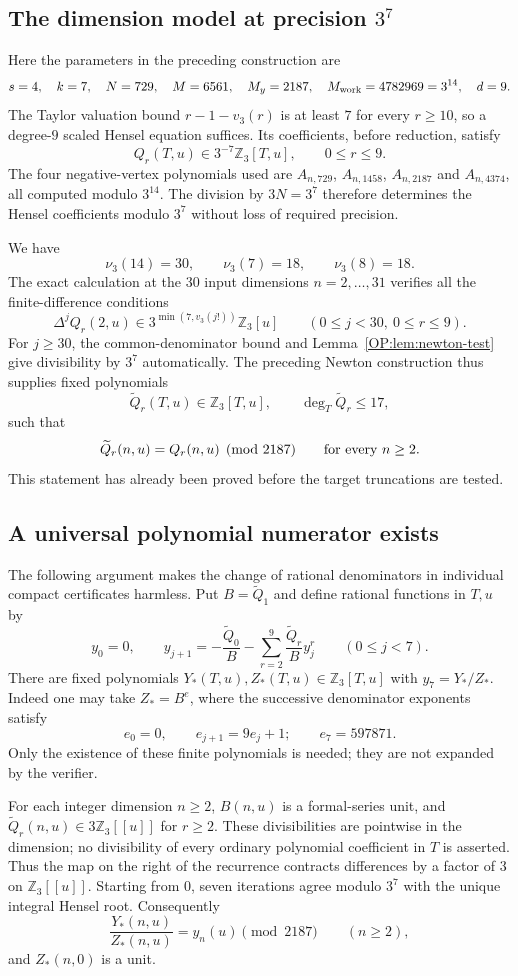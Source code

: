 \documentclass[11pt,a4paper]{article}
\theoremstyle{definition}\newtheorem{definition}[theorem]{Definition}
\theoremstyle{remark}\newtheorem{remark}[theorem]{Remark}
\numberwithin{equation}{section}
\begin{document}
\subsection{The dimension model at precision $3^7$}
Here the parameters in the preceding construction are
\[
 s=4,\quad k=7,\quad N=729,\quad M=6561,\quad M_y=2187,
 \quad M_{\rm work}=4782969=3^{14},\quad d=9.
\]
The Taylor valuation bound $r-1-v_3(r)$ is at least $7$ for every
$r\geq10$, so a degree-$9$ scaled Hensel equation suffices.  Its
coefficients, before reduction, satisfy
\[
 Q_r(T,u)\in3^{-7}\mathbb Z_3[T,u],\qquad0\leq r\leq9.
\]
The four negative-vertex polynomials used are
$A_{n,729}$, $A_{n,1458}$, $A_{n,2187}$ and $A_{n,4374}$, all computed
modulo $3^{14}$.  The division by $3N=3^7$ therefore determines the
Hensel coefficients modulo $3^7$ without loss of required precision.

We have
\[
 \nu_3(14)=30,\qquad \nu_3(7)=18,\qquad \nu_3(8)=18.
\]
The exact calculation at the $30$ input dimensions $n=2,\ldots,31$
verifies all the finite-difference conditions
\[
 \Delta^j Q_r(2,u)\in
 3^{\min(7,v_3(j!))}\mathbb Z_3[u]
       \qquad(0\leq j<30,\ 0\leq r\leq9).
\]
For $j\geq30$, the common-denominator bound and
Lemma~\ref{OP:lem:newton-test} give divisibility by $3^7$ automatically.
The preceding Newton construction thus supplies fixed polynomials
\[
 \widetilde Q_r(T,u)\in\mathbb Z_3[T,u],\qquad
 \deg_T\widetilde Q_r\leq17,
\]
such that
\[
 \widetilde Q_r(n,u)=Q_r(n,u)\pmod{2187}
                     \qquad\hbox{for every }n\geq2.
\]
This statement has already been proved before the target truncations
are tested.

\subsection{A universal polynomial numerator exists}
The following argument makes the change of rational denominators in
individual compact certificates harmless.  Put
$B=\widetilde Q_1$ and define rational functions in $T,u$ by
\[
 y_0=0,\qquad
 y_{j+1}=-\frac{\widetilde Q_0}{B}
       -\sum_{r=2}^9\frac{\widetilde Q_r}{B}y_j^r
                        \qquad(0\leq j<7).
\]
There are fixed polynomials $Y_*(T,u),Z_*(T,u)\in\mathbb Z_3[T,u]$
with $y_7=Y_*/Z_*$.  Indeed one may take $Z_*=B^e$, where the
successive denominator exponents satisfy
\[
 e_0=0,\qquad e_{j+1}=9e_j+1;
 \qquad e_7=597871.
\]
Only the existence of these finite polynomials is needed; they are not
expanded by the verifier.

For each integer dimension $n\geq2$, $B(n,u)$ is a formal-series unit,
and $\widetilde Q_r(n,u)\in3\mathbb Z_3[[u]]$ for $r\geq2$.
These divisibilities are pointwise in the dimension; no divisibility
of every ordinary polynomial coefficient in $T$ is asserted.  Thus the
map on the right of the recurrence contracts differences by a factor
of $3$ on $\mathbb Z_3[[u]]$.  Starting from $0$, seven iterations
agree modulo $3^7$ with the unique integral Hensel root.  Consequently
\begin{equation}\label{OP:eq:universal-rational-root4}
 \frac{Y_*(n,u)}{Z_*(n,u)}=y_n(u)\pmod{2187}
                          \qquad(n\geq2),
\end{equation}
and $Z_*(n,0)$ is a unit.
\end{document}
